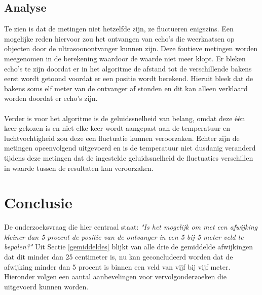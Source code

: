 \documentclass{article}
\begin{document}
\subsection{Analyse}
Te zien is dat de metingen niet hetzelfde zijn, ze fluctueren enigszins. Een mogelijke reden hiervoor zou 
het ontvangen van echo's die weerkaatsen op objecten door de ultrasoonontvanger kunnen zijn. Deze foutieve metingen worden meegenomen in de berekening waardoor de waarde niet meer klopt. Er bleken echo's te zijn doordat er in het algoritme de afstand tot de verschillende bakens eerst wordt getoond voordat er een positie wordt berekend. Hieruit bleek dat de bakens soms elf meter van de ontvanger af stonden en dit kan alleen verklaard worden doordat er echo's zijn.\\
\\
Verder is voor het algoritme is de geluidssnelheid van belang, omdat deze \'{e}\'{e}n keer gekozen is en niet elke keer wordt aangepast aan de temperatuur en luchtvochtigheid zou deze een fluctuatie kunnen veroorzaken. Echter zijn de metingen opeenvolgend uitgevoerd en is de temperatuur niet dusdanig veranderd tijdens deze metingen dat de ingestelde geluidssnelheid de fluctuaties verschillen in waarde tussen de resultaten kan veroorzaken.

\section{Conclusie}
 De onderzoeksvraag die hier centraal staat: \textit{"Is het mogelijk om met een afwijking kleiner dan 5 procent de positie van de ontvanger in een 5 bij 5 meter veld te bepalen?"} Uit Sectie \ref{gemiddeldes} blijkt van alle drie de gemiddelde afwijkingen dat dit minder dan 25 centimeter is, nu kan geconcludeerd worden dat de afwijking minder dan 5 procent is binnen een veld van vijf bij vijf meter. Hieronder volgen een aantal aanbevelingen voor vervolgonderzoeken die uitgevoerd kunnen worden. 
\end{document}
